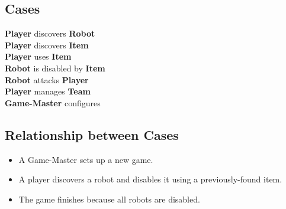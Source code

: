 \documentclass{beamer}
\begin{document}
\subsection{Cases}
\begin{frame}
\textbf{Player} discovers \textbf{Robot}\\
\textbf{Player} discovers \textbf{Item}\\
\textbf{Player} uses \textbf{Item}\\
\textbf{Robot} is disabled by \textbf{Item}\\
\textbf{Robot} attacks \textbf{Player}\\
\textbf{Player} manages \textbf{Team}\\
\textbf{Game-Master} configures\\
\subsection{Relationship between Cases}
\begin{itemize}
	\item A Game-Master sets up a new game.
	\item A player discovers a robot and disables it using a previously-found item.
	\item The game finishes because all robots are disabled.
\end{itemize}
\end{frame}
\end{document}
